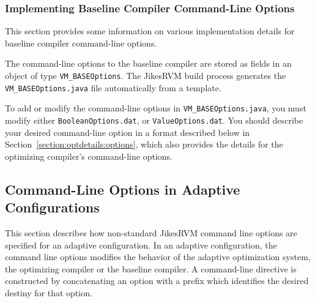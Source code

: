 \subsubsection{Implementing Baseline Compiler Command-Line Options}

This section provides some information on various
implementation details for baseline compiler command-line options.

The command-line options to the baseline compiler are
stored as fields in an object of type {\tt VM\_BASEOptions}.
The Jikes\trademark RVM build process generates the {\tt VM\_BASEOptions.java} 
file automatically from a template.  

To add or modify the command-line options in {\tt VM\_BASEOptions.java},
you must modify either {\tt BooleanOptions.dat}, or {\tt ValueOptions.dat}.
You should describe your desired command-line option in a format 
described below in Section~\ref{section:optdetails:options}, which 
also provides the details for the optimizing compiler's command-line options.

\JikesTMFooter

\subsection{Command-Line Options in Adaptive Configurations}
\label{subsection:adaptive:cmdline}

This section describes how non-standard Jikes\trademark RVM command line options are 
specified for an adaptive configuration.
In an adaptive configuration, the command line options modifies
the behavior of the adaptive optimization system,
the optimizing compiler or the baseline compiler.
A command-line directive is constructed by concatenating an option 
with a prefix which identifies the desired destiny for that option.


